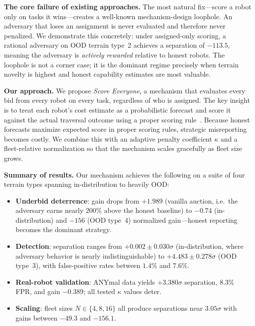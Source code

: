 \documentclass[letterpaper, 10pt, conference]{ieeeconf}
\begin{document}
\textbf{The core failure of existing approaches.}
The most natural fix---score a robot only on tasks it wins---creates a
well-known mechanism-design loophole.  An adversary that loses an assignment
is never evaluated and therefore never penalized.  We demonstrate this
concretely: under assigned-only scoring, a rational adversary on OOD terrain
type~2 achieves a separation of $-113.5$, meaning the adversary is
\emph{actively rewarded} relative to honest robots.  The loophole is not a
corner case; it is the dominant regime precisely when terrain novelty is highest
and honest capability estimates are most valuable.

\textbf{Our approach.}
We propose \emph{Score Everyone}, a mechanism that evaluates every bid from
every robot on every task, regardless of who is assigned.  The key insight is
to treat each robot's cost estimate as a probabilistic forecast and score it
against the actual traversal outcome using a proper scoring
rule~\cite{gneiting2007strictly}.  Because honest forecasts maximize expected
score in proper scoring rules, strategic misreporting becomes costly.  We
combine this with an adaptive penalty coefficient $\kappa$ and a
fleet-relative normalization so that the mechanism scales gracefully as fleet
size grows.

\textbf{Summary of results.}
Our mechanism achieves the following on a suite of four terrain types spanning
in-distribution to heavily OOD:
\begin{itemize}
  \item \textbf{Underbid deterrence}: gain drops from $+1.989$ (vanilla
        auction, i.e.\ the adversary earns nearly $200\%$ above the honest
        baseline) to $-0.74$ (in-distribution) and $-156$ (OOD type~4)
        normalized gain---honest reporting becomes the dominant strategy.
  \item \textbf{Detection}: separation ranges from $+0.002\pm0.030\sigma$
        (in-distribution, where adversary behavior is nearly indistinguishable)
        to $+4.483\pm0.278\sigma$ (OOD type~3), with false-positive rates
        between $1.4\%$ and $7.6\%$.
  \item \textbf{Real-robot validation}: ANYmal data yields $+3.380\sigma$
        separation, $8.3\%$ FPR, and gain $-0.389$; all tested $\kappa$
        values deter.
  \item \textbf{Scaling}: fleet sizes $N \in \{4, 8, 16\}$ all produce
        separations near $3.05\sigma$ with gains between $-49.3$ and $-156.1$.
\end{itemize}
\end{document}
